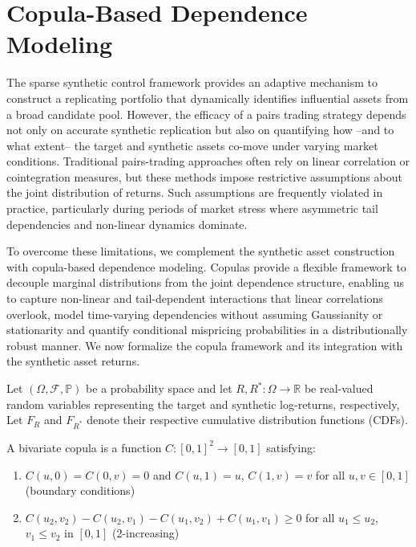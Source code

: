 \section{Copula-Based Dependence Modeling}

The sparse synthetic control framework provides an adaptive mechanism to construct a replicating portfolio that dynamically identifies influential assets from a broad candidate pool. However, the efficacy of a pairs trading strategy depends not only on accurate synthetic replication but also on quantifying how --and to what extent-- the target and synthetic assets co-move under varying market conditions. 
%
Traditional pairs-trading approaches often rely on linear correlation or cointegration measures, but these methods impose restrictive assumptions about the joint distribution of returns. Such assumptions are frequently violated in practice, particularly during periods of market stress where asymmetric tail dependencies and non-linear dynamics dominate.

To overcome these limitations, we complement the synthetic asset construction with copula-based dependence modeling. Copulas provide a flexible framework to decouple marginal distributions from the joint dependence structure, enabling us to capture non-linear and tail-dependent interactions that linear correlations overlook, model time-varying dependencies without assuming Gaussianity or stationarity and quantify conditional mispricing probabilities in a distributionally robust manner.
%
We now formalize the copula framework and its integration with the synthetic asset returns.

Let $(\Omega, \mathcal{F}, \mathbb{P})$ be a probability space and let $R, R^*: \Omega \to \mathbb{R}$ be real-valued random variables representing the target and synthetic log-returns, respectively, 
Let $F_R$ and $F_{R^*}$ denote their respective cumulative distribution functions (CDFs).

\begin{definition}[Copula]
A bivariate copula is a function $C: [0,1]^2 \to [0,1]$ satisfying:
\begin{enumerate}
   \item $C(u,0) = C(0,v) = 0$ and $C(u,1) = u$, $C(1,v) = v$ for all $u,v \in [0,1]$ (boundary conditions)
   \item $C(u_2,v_2) - C(u_2,v_1) - C(u_1,v_2) + C(u_1,v_1) \geq 0$ for all $u_1 \leq u_2$, $v_1 \leq v_2$ in $[0,1]$ (2-increasing)
\end{enumerate}
\end{definition}

